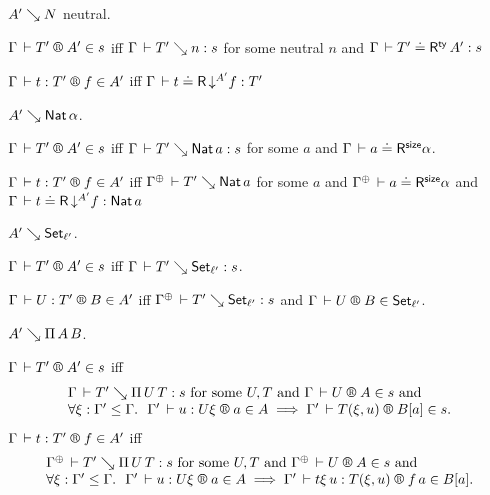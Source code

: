 \documentclass[acmlarge,review,anonymous]{acmart}\settopmatter{printfolios=true}
\begin{document}
\begin{caselist}

\vspace{2ex}
\nextcase $A' \evalsto N$ neutral.

  \noindent
  $\LRTS{\Gamma}{T'}{A'} s$ iff
  $\Gamma \der T' \evalsto n : s$ for some neutral $n$ and
  $\Gamma \der T' \doteq \tRty\,A' : s$

  \noindent
  $\LR{\Gamma}{t}{T'}{f}{A'}$ iff
  $\Gamma \der t \doteq \tR \, \down {A'} f : T'$

\vspace{2ex}
\nextcase $A' \evalsto \Nat \alpha$.

  \noindent
  $\LRTS{\Gamma}{T'}{A'} s$ iff $\Gamma \der T' \evalsto \Nat a : s$ for some $a$ and $\LRSize \Gamma a \alpha$.

  \noindent
  $\LR{\Gamma}{t}{T'}{f}{A'}$ iff $\resurrect\Gamma \der T' \evalsto \Nat a$ for some $a$ and
  $\LRSize {\resurrect\Gamma} a \alpha$ and
  $\Gamma \der t \doteq \tR\,\down{A'} f : \Nat a$


\vspace{2ex}
\nextcase $A' \evalsto \Set[\ell']$.

  \noindent
  $\LRTS {\Gamma} {T'} {A'} s$ iff $\Gamma \der T' \evalsto \Set[\ell'] : s$.

  \noindent
  $\LR \Gamma U {T'} B {A'}$ iff
  $\resurrect\Gamma \der T' \evalsto \Set[\ell'] : s$ and $\LRT \Gamma U B {\ell'}$.

\vspace{2ex}
\nextcase $A' \evalsto \piT A B$.

\noindent
$\LRTS \Gamma {T'} {A'} s$ iff
\[
\begin{array}{l}
\Gamma \der T' \evalsto \piT U T : s \mforsome U, T \mand \LRTS \Gamma U A s \mand \\
\forall \xi : \Gamma' \leq \Gamma.\ \
\LR {\Gamma'} u {U\xi} a A \implies \LRTS {\Gamma'} {T(\xi,u)} {B[a]} s
. \\
\end{array}
\]
$\LR \Gamma t {T'} f {A'}$ iff
\[
\begin{array}{l}
\resurrect\Gamma \der T' \evalsto \piT U T : s \mforsome U, T \mand \LRTS {\resurrect\Gamma} U A s \mand \\
\forall \xi : \Gamma' \leq \Gamma.\ \
\LR {\Gamma'} u {U\xi} a A \implies \LR {\Gamma'} {t\xi\,u} {T(\xi,u)} {f\,a} {B[a]}
.
\end{array}
\]


\end{caselist}
\end{document}
